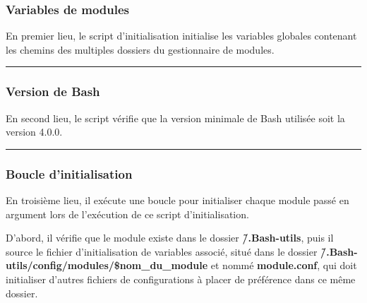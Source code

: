 \documentclass[a4paper,10pt]{article}
\begin{document}
    \color{sec3}
    \subsubsection{Variables de modules}\color{text}

    \begin{justify}
        En premier lieu, le script d'initialisation initialise les variables globales contenant les chemins des multiples dossiers du gestionnaire de modules.
    \end{justify}


    \color{sec3}\par\noindent\rule{\textwidth}{0.4pt}\color{text}

    \color{sec3}
    \subsubsection{Version de Bash}\color{text}

    \begin{justify}
        En second lieu, le script vérifie que la version minimale de Bash utilisée soit la version 4.0.0.
    \end{justify}



    \color{sec3}\par\noindent\rule{\textwidth}{0.4pt}\color{text}

    \color{sec3}
    \subsubsection{Boucle d'initialisation}\color{text}

    \begin{justify}
        En troisième lieu, il exécute une boucle pour initialiser chaque module passé en argument lors de l'exécution de ce script d'initialisation.
    \end{justify}

    \begin{justify}
        D'abord, il vérifie que le module existe dans le dossier \textbf{\color{path}\~/.Bash-utils}, puis il source le fichier d'initialisation de variables associé, situé dans le dossier \textbf{\color{path}\~/.Bash-utils/config/modules/\color{vars}\$nom\_du\_module} et nommé \textbf{\color{path}module.conf}, qui doit initialiser d'autres fichiers de configurations à placer de préférence dans ce même dossier.
    \end{justify}
\end{document}
